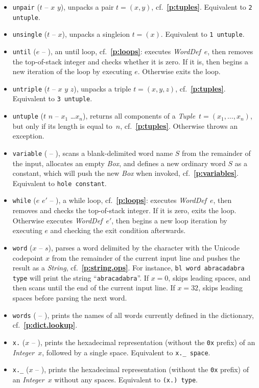 \documentclass[12pt,oneside]{article}
\def\refpoint#1{{\rm\textbf{\ref{#1}}}}
\let\ptref=\refpoint
\begin{document}
\begin{itemize}
\item {\tt unpair} ($t$ -- $x$ $y$), unpacks a pair $t=(x,y)$, cf.~\ptref{p:tuples}. Equivalent to {\tt 2 untuple}.
\item {\tt unsingle} ($t$ -- $x$), unpacks a singleion $t=(x)$. Equivalent to {\tt 1 untuple}.
\item {\tt until} ($e$ -- ), an until loop, cf.~\ptref{p:loops}: executes {\em WordDef\/}~$e$, then removes the top-of-stack integer and checks whether it is zero. If it is, then begins a new iteration of the loop by executing $e$. Otherwise exits the loop.
\item {\tt untriple} ($t$ -- $x$ $y$ $z$), unpacks a triple $t=(x,y,z)$, cf.~\ptref{p:tuples}. Equivalent to {\tt 3 untuple}.
\item {\tt untuple} ($t$ $n$ -- $x_1$ \dots $x_n$), returns all components of a {\em Tuple\/}~$t=(x_1,\ldots,x_n)$, but only if its length is equal to~$n$, cf.~\ptref{p:tuples}. Otherwise throws an exception.
\item {\tt variable} ( -- ), scans a blank-delimited word name $S$ from the remainder of the input, allocates an empty {\em Box}, and defines a new ordinary word $S$ as a constant, which will push the new {\em Box\/} when invoked, cf.~\ptref{p:variables}. Equivalent to {\tt hole constant}.
\item {\tt while} ($e$ $e'$ -- ), a while loop, cf.~\ptref{p:loops}: executes {\em WordDef\/}~$e$, then removes and checks the top-of-stack integer. If it is zero, exits the loop. Otherwise executes {\em WordDef\/}~$e'$, then begins a new loop iteration by executing $e$ and checking the exit condition afterwards.
\item {\tt word} ($x$ -- $s$), parses a word delimited by the character with the Unicode codepoint $x$ from the remainder of the current input line and pushes the result as a {\em String}, cf.~\ptref{p:string.ops}. For instance, {\tt bl word abracadabra type} will print the string ``{\tt abracadabra}''. If $x=0$, skips leading spaces, and then scans until the end of the current input line. If $x=32$, skips leading spaces before parsing the next word.
\item {\tt words} ( -- ), prints the names of all words currently defined in the dictionary, cf.~\ptref{p:dict.lookup}.
\item {\tt x.} ($x$ -- ), prints the hexadecimal representation (without the {\tt 0x} prefix) of an {\em Integer\/}~$x$, followed by a single space. Equivalent to {\tt x.\_ space}.
\item {\tt x.\_} ($x$ -- ), prints the hexadecimal representation (without the {\tt 0x} prefix) of an {\em Integer\/}~$x$ without any spaces. Equivalent to {\tt (x.)~type}.

\end{itemize}
\end{document}
